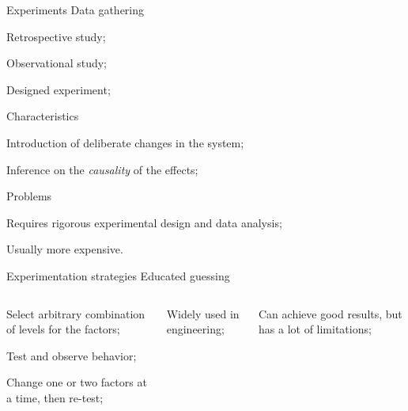 \documentclass[t]{beamer}
\begin{document}

\begin{ftst}
{Experiments}
{Data gathering}
\begin{block}{}
	{\small\bitems Retrospective study;
		\item Observational study;
		\item \alert{Designed experiment};
	\eitem}
\end{block}
\begin{block}{Characteristics}
	{\small\bitems Introduction of deliberate changes in the system;
		\item Inference on the \textit{causality} of the effects;
		\eitem}
\end{block}
\begin{block}{Problems}
	{\small\bitems Requires rigorous experimental design and data analysis;
	\item Usually more expensive.
	\eitem}
\end{block}
\end{ftst}


\begin{ftst}
{Experimentation strategies}
{Educated guessing}
\vspace{-1em}
\begin{columns}[T]
	\begin{block}{}
		\bitems Select arbitrary combination of levels for the factors;
			\item Test and observe behavior; 
			\item Change one or two factors at a time, then re-test;
		\eitem
	\end{block}
\bitems Widely used in engineering;
\item Can achieve good results, but has a lot of limitations;
\eitem
\end{columns}
\end{ftst}
\end{document}
